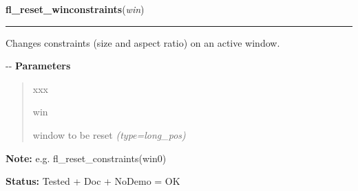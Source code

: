 \hspace{.8\funcindent}\begin{boxedminipage}{\funcwidth}

    \raggedright \textbf{fl\_reset\_winconstraints}(\textit{win})

    \vspace{-1.5ex}

    \rule{\textwidth}{0.5\fboxrule}
\setlength{\parskip}{2ex}

Changes constraints (size and aspect ratio) on an active window.

-{}-
\setlength{\parskip}{1ex}
      \textbf{Parameters}
      \vspace{-1ex}

      \begin{quote}
        \begin{Ventry}{xxx}

          \item[win]


window to be reset
            {\it (type=long\_pos)}

        \end{Ventry}

      \end{quote}

\textbf{Note:} 
e.g. fl\_reset\_constraints(win0)


\textbf{Status:} 
Tested + Doc + NoDemo = OK


    \end{boxedminipage}

    \label{xformslib:flxbasic:fl_winsize}

    \vspace{0.5ex}

